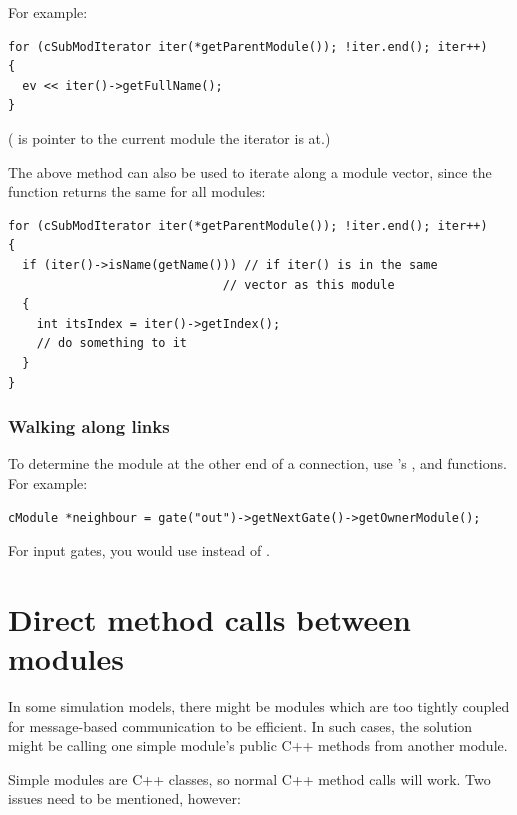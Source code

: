 For example:

\begin{verbatim}
for (cSubModIterator iter(*getParentModule()); !iter.end(); iter++)
{
  ev << iter()->getFullName();
}
\end{verbatim}

( is pointer to the current module the iterator is at.)


The above method can also be used to iterate along a module
vector, since the 
function returns the same for all modules:

\begin{verbatim}
for (cSubModIterator iter(*getParentModule()); !iter.end(); iter++)
{
  if (iter()->isName(getName())) // if iter() is in the same
                              // vector as this module
  {
    int itsIndex = iter()->getIndex();
    // do something to it
  }
}
\end{verbatim}


\subsubsection{Walking along links}

To determine the module at the other end of a connection, use
's ,  and
 functions. For example:

\begin{verbatim}
cModule *neighbour = gate("out")->getNextGate()->getOwnerModule();
\end{verbatim}

For input gates, you would use  instead of
.


\section{Direct method calls between modules}
\label{sec:simple-modules:direct-method-calls}

In some simulation models, there might be modules which are too
tightly coupled for message-based communication to be efficient.
In such cases, the solution might be calling one simple module's public
C++ methods from another module.

Simple modules are C++ classes, so normal C++ method calls will
work. Two issues need to be mentioned, however:

